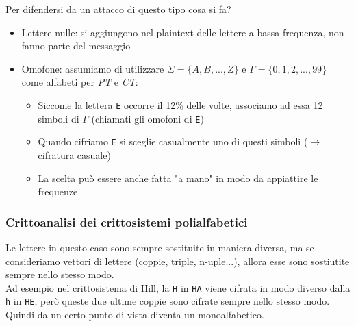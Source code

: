 Per difendersi da un attacco di questo tipo cosa si fa?
\begin{itemize}
	\item Lettere nulle: si aggiungono nel plaintext delle lettere a bassa frequenza, non fanno parte del messaggio
	\item Omofone: assumiamo di utilizzare $\Sigma=\{A,B, ...,Z\}$ e $\Gamma=\{0,1,2,...,99\}$ come alfabeti per \textit{PT} e \textit{CT}:
	\begin{itemize}
		\item Siccome la lettera \texttt{E} occorre il 12\% delle volte, associamo ad essa 12 simboli di $\Gamma$ (chiamati gli omofoni di \texttt{E})
		\item Quando cifriamo \texttt{E} si sceglie casualmente uno di questi simboli ($\rightarrow$ cifratura casuale)
		\item La scelta può essere anche fatta "a mano" in modo da appiattire le frequenze
	\end{itemize}
\end{itemize}

\subsubsection*{Crittoanalisi dei crittosistemi polialfabetici}
Le lettere in questo caso sono sempre sostituite in maniera diversa, ma se consideriamo vettori di lettere (coppie, triple, n-uple...), allora esse sono sostiutite sempre nello stesso modo.\\
Ad esempio nel crittosistema di Hill, la \texttt{H} in \texttt{HA} viene cifrata in modo diverso dalla \texttt{h} in \texttt{HE}, però queste due ultime coppie sono cifrate sempre nello stesso modo.
Quindi da un certo punto di vista diventa un monoalfabetico.

